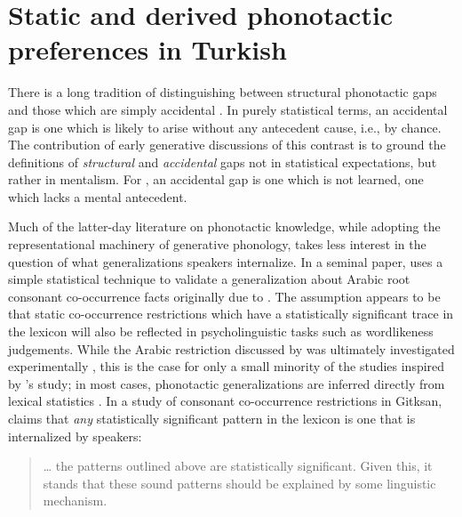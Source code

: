 \chapter{Static and derived phonotactic preferences in Turkish}
\label{turkish}

There is a long tradition of distinguishing between structural phonotactic gaps and those which are simply accidental \citep[e.g.,][]{Fischer-Jorgensen1952,Saporta1955,Saporta1958,Vogt1954}. In purely statistical terms, an accidental gap is one which is likely to arise without any antecedent cause, i.e., by chance. The contribution of early generative discussions of this contrast \citep[e.g.,][]{Halle1962,Chomsky1965,SPE} is to ground the definitions of \emph{structural} and \emph{accidental} gaps not in statistical expectations, but rather in mentalism. For \citeauthor{SPE}, an accidental gap is one which is not learned, one which lacks a mental antecedent.

Much of the latter-day literature on phonotactic knowledge, while adopting the representational machinery of generative phonology, takes less interest in the question of what generalizations speakers internalize. In a seminal paper, \citet{McCarthy1988} uses a simple statistical technique to validate a generalization about Arabic root consonant co-occurrence facts originally due to \citet{Greenberg1950}. The assumption appears to be that static co-occurrence restrictions which have a statistically significant trace in the lexicon will also be reflected in psycholinguistic tasks such as wordlikeness judgements. While the Arabic restriction discussed by \citeauthor{McCarthy1988} was ultimately investigated experimentally \citep{Frisch2004}, this is the case for only a small minority of the studies inspired by \citeauthor{McCarthy1988}'s study; in most cases, phonotactic generalizations are inferred directly from lexical statistics \citep[e.g.,][]{Anttila2008a,Berkley1994b,Berkley1994a,Berkley2000,Brown2010,Buckley1997,Coetzee2008a,Elmedlaoui1995,Graff2011,MacEachern1999,Kinney2005,Kawahara2006,Martin2007,Martin2011,Mester1988,Miller-Ockhuizen2003,Padgett1992,Padgett1995,Pozdniakov2007,Yip1989}. In a study of consonant co-occurrence restrictions in Gitksan, \citet{Brown2010} claims that \emph{any} statistically significant pattern in the lexicon is one that is internalized by speakers:

\begin{quote}
\ldots{} the patterns outlined above are statistically significant. Given this, it stands that these sound patterns should be explained by some linguistic mechanism. \citep[][48]{Brown2010}
\end{quote}

